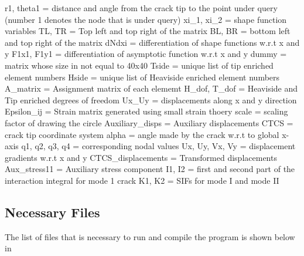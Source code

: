 \documentclass[fleqn, 12.5pt,a4paper]{report}
\begin{document}
r1, theta1 = distance and angle from the crack tip to the point under query (number 1 denotes the node that is under query)\newline
xi{\_}1, xi{\_}2 = shape function variables\newline
TL, TR = Top left and top right of the matrix\newline
BL, BR = bottom left and top right of the matrix\newline
dNdxi = differentiation of shape functions w.r.t x and y\newline
F1x1, F1y1 = differentiation of asymptotic function w.r.t x and y\newline
dummy = matrix whose size in not equal to 40x40\newline
Tside = unique list of tip enriched element numbers \newline
Hside = unique list of Heaviside enriched element numbers\newline
A{\_}matrix = Assignment matrix of each elememt\newline
H{\_}dof, T{\_}dof = Heaviside and Tip enriched degrees of freedom\newline
Ux{\_}Uy = displacements along x and y direction\newline
Epsilon{\_}ij = Strain matrix generated using small strain thoery\newline
scale = scaling factor of drawing the circle \newline
Auxiliary{\_}disps = Auxiliary displacements\newline
CTCS = crack tip coordinate system\newline
alpha = angle made by the crack w.r.t to global x-axis\newline
q1, q2, q3, q4 = corresponding nodal values\newline
Ux, Uy, Vx, Vy = displacement gradients w.r.t x and y\newline
CTCS{\_}displacements = Transformed displacements\newline
Aux{\_}stress11 = Auxiliary stress component \newline
I1, I2 = first and second part of the interaction integral for mode 1 crack \newline
K1, K2 = SIFs for mode I and mode II
\subsection{Necessary Files}
The list of files that is necessary to run and compile the program is shown below in
\end{document}
